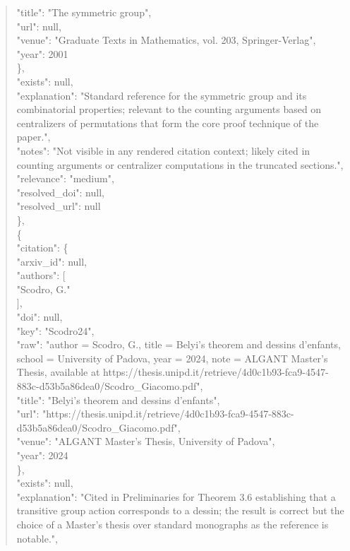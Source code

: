 \documentclass[11pt]{article}
\begin{document}
\begin{quote}
        "title": "The symmetric group",\\
        "url": null,\\
        "venue": "Graduate Texts in Mathematics, vol. 203, Springer-Verlag",\\
        "year": 2001\\
      \},\\
      "exists": null,\\
      "explanation": "Standard reference for the symmetric group and its combinatorial properties; relevant to the counting arguments based on centralizers of permutations that form the core proof technique of the paper.",\\
      "notes": "Not visible in any rendered citation context; likely cited in counting arguments or centralizer computations in the truncated sections.",\\
      "relevance": "medium",\\
      "resolved\_doi": null,\\
      "resolved\_url": null\\
    \},\\
    \{\\
      "citation": \{\\
        "arxiv\_id": null,\\
        "authors": [\\
          "Scodro, G."\\
        ],\\
        "doi": null,\\
        "key": "Scodro24",\\
        "raw": "author = Scodro, G., title = Belyi's theorem and dessins d'enfants, school = University of Padova, year = 2024, note = ALGANT Master's Thesis, available at https://thesis.unipd.it/retrieve/4d0c1b93-fca9-4547-883c-d53b5a86dea0/Scodro\_Giacomo.pdf",\\
        "title": "Belyi's theorem and dessins d'enfants",\\
        "url": "https://thesis.unipd.it/retrieve/4d0c1b93-fca9-4547-883c-d53b5a86dea0/Scodro\_Giacomo.pdf",\\
        "venue": "ALGANT Master's Thesis, University of Padova",\\
        "year": 2024\\
      \},\\
      "exists": null,\\
      "explanation": "Cited in Preliminaries for Theorem 3.6 establishing that a transitive group action corresponds to a dessin; the result is correct but the choice of a Master's thesis over standard monographs as the reference is notable.",\\

\end{quote}
\end{document}
